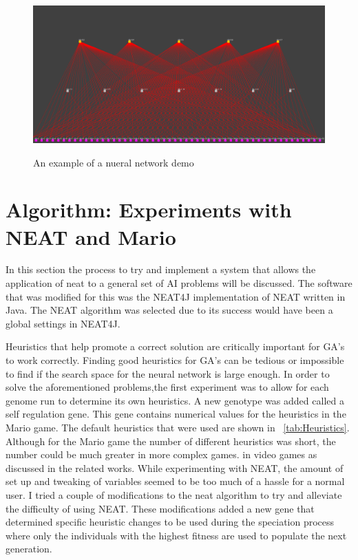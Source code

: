 \documentclass[12pt]{ucthesis} \newif\ifpdf \ifx\pdfoutput\undefined
\begin{document}
\begin{figure}[h!]
  \caption{An example of a nueral network demo}
  \centering
    \includegraphics[width=1\textwidth]{simplemarionet.png}
   \label{fig:simplemarionet} 
\end{figure}


\chapter{Algorithm: Experiments with NEAT and Mario}


In this section the process to try and implement a system that allows the
application of neat to a general set of AI problems will be discussed. The
software that was modified for this was the NEAT4J implementation of NEAT
written in Java. The NEAT algorithm was selected due to its success would have
been a global settings in NEAT4J.

Heuristics that help promote a correct solution are critically important for
GA’s to work correctly. Finding good heuristics for GA’s can be tedious or
impossible to find if the search space for the neural network is large enough.
In order to solve the aforementioned problems,the first experiment was to allow
for each genome run to determine its own heuristics.  A new genotype was added
called a self regulation gene. This gene contains numerical values for the
heuristics in the Mario game. The default heuristics that were used are shown in
~\ref{tab:Heuristics}. Although for the Mario game the number of different
heuristics was short, the number could be much greater in more complex games. in
video games as discussed in the related works. While experimenting with NEAT,
the amount of set up and tweaking of variables seemed to be too much of a hassle
for a normal user.  I tried a couple of modifications to the neat algorithm to
try and alleviate the difficulty of using NEAT.  These modifications added a new
gene that determined specific heuristic changes to be used during the speciation
process where only the individuals with the highest fitness are used to populate
the next generation.
\end{document}

